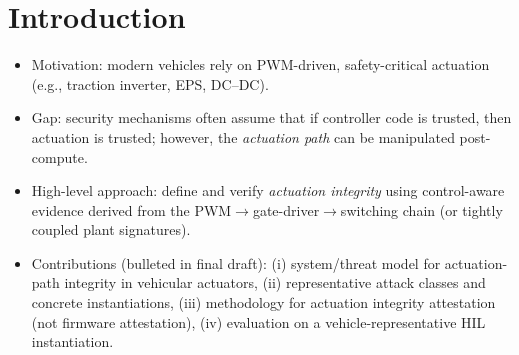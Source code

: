 \section{Introduction}
\begin{itemize}
    \item Motivation: modern vehicles rely on PWM-driven, safety-critical actuation (e.g., traction inverter, EPS, DC--DC).
    \item Gap: security mechanisms often assume that if controller code is trusted, then actuation is trusted; however, the \emph{actuation path} can be manipulated post-compute.
    \item High-level approach: define and verify \emph{actuation integrity} using control-aware evidence derived from the PWM$\rightarrow$gate-driver$\rightarrow$switching chain (or tightly coupled plant signatures).
    \item Contributions (bulleted in final draft): (i) system/threat model for actuation-path integrity in vehicular actuators, (ii) representative attack classes and concrete instantiations, (iii) methodology for actuation integrity attestation (not firmware attestation), (iv) evaluation on a vehicle-representative HIL instantiation.
\end{itemize}